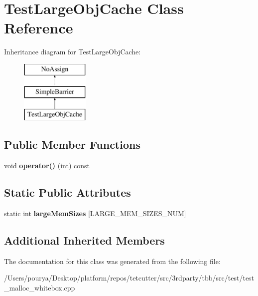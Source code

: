 \hypertarget{classTestLargeObjCache}{}\section{Test\+Large\+Obj\+Cache Class Reference}
\label{classTestLargeObjCache}
Inheritance diagram for Test\+Large\+Obj\+Cache\+:\begin{figure}[H]
\begin{center}
\leavevmode
\includegraphics[height=3.000000cm]{classTestLargeObjCache}
\end{center}
\end{figure}
\subsection*{Public Member Functions}
\begin{DoxyCompactItemize}
\item 
\hypertarget{classTestLargeObjCache_a916ff39f6889631e15e6e95674704575}{}void {\bfseries operator()} (int) const \label{classTestLargeObjCache_a916ff39f6889631e15e6e95674704575}

\end{DoxyCompactItemize}
\subsection*{Static Public Attributes}
\begin{DoxyCompactItemize}
\item 
\hypertarget{classTestLargeObjCache_a5156b63ce7813cbd2da09e8f159df947}{}static int {\bfseries large\+Mem\+Sizes} \mbox{[}L\+A\+R\+G\+E\+\_\+\+M\+E\+M\+\_\+\+S\+I\+Z\+E\+S\+\_\+\+N\+U\+M\mbox{]}\label{classTestLargeObjCache_a5156b63ce7813cbd2da09e8f159df947}

\end{DoxyCompactItemize}
\subsection*{Additional Inherited Members}


The documentation for this class was generated from the following file\+:\begin{DoxyCompactItemize}
\item 
/\+Users/pourya/\+Desktop/platform/repos/tetcutter/src/3rdparty/tbb/src/test/test\+\_\+malloc\+\_\+whitebox.\+cpp\end{DoxyCompactItemize}
